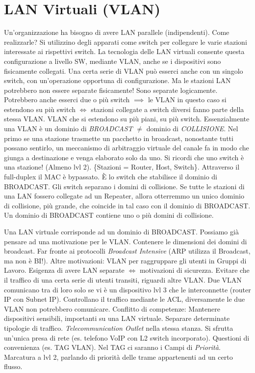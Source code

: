 \section{LAN Virtuali (VLAN)}

Un'organizzazione ha bisogno di avere LAN parallele (indipendenti). Come realizzarle? Si utilizzino degli apparati come switch per collegare le varie stazioni interessate ai rispettivi switch. La tecnologia delle LAN virtuali consente questa configurazione a livello SW, mediante VLAN, anche se i dispositivi sono fisicamente collegati. Una certa serie di VLAN può esserci anche con un singolo switch, con un'operazione opportuna di configurazione. Ma le stazioni LAN potrebbero non essere separate fisicamente! Sono separate logicamente. Potrebbero anche esserci due o più switch $\implies$ le VLAN in questo caso si estendono su più switch $\iff$ stazioni collegate a switch diversi fanno parte della stessa VLAN. VLAN che si estendono su più piani, su più switch. Essenzialmente una VLAN è un dominio di \textit{BROADCAST} $\neq$ dominio di \textit{COLLISIONE}. Nel primo se una stazione trasmette un pacchetto in broadcast, nonostante tutti possano sentirlo, un meccanismo di arbitraggio virtuale del canale fa in modo che giunga a destinazione e venga elaborato solo da uno. Si ricordi che uno switch è una stazione! (Almeno lvl 2). \{Stazioni = Router, Host, Switch\}. Attraverso il full-duplex il MAC è bypassato. \`E lo switch che stabilisce il dominio di BROADCAST. Gli switch separano i domini di collisione. Se tutte le stazioni di una LAN fossero collegate ad un Repeater, allora otterremmo un unico dominio di collisione, più grande, che coincide in tal caso con il dominio di BROADCAST. Un dominio di BROADCAST contiene uno o più domini di collisione.

Una LAN virtuale corrisponde ad un dominio di BROADCAST. Possiamo già pensare ad una motivazione per le VLAN. Contenere le dimensioni dei domini di broadcast. Far fronte ai protocolli \textit{Broadcast Intensive} (ARP utilizza il Broadcast, ma non è BI!). Altre motivazioni: VLAN per raggruppare gli utenti in Gruppi di Lavoro. Esigenza di avere LAN separate $\iff$ motivazioni di sicurezza. Evitare che il traffico di una certa serie di utenti transiti, riguardi altre VLAN. Due VLAN comunicano tra di loro solo se vi è un dispositivo lvl 3 che le interconnette (router IP con Subnet IP). Controllano il traffico mediante le ACL, diversamente le due VLAN non potrebbero comunicare.
Conflitto di competenze: Mantenere dispositivi sensibili, importanti su una LAN virtuale. Separare determinate tipologie di traffico. \textit{Telecommunication Outlet} nella stessa stanza. Si sfrutta un'unica presa di rete (es. telefono VoIP con L2 switch incorporato). Questioni di convenienza (es. TAG VLAN). Nel TAG ci saranno i Campi di \textit{Priorità}. Marcatura a lvl 2, parlando di priorità delle trame appartenenti ad un certo flusso.


